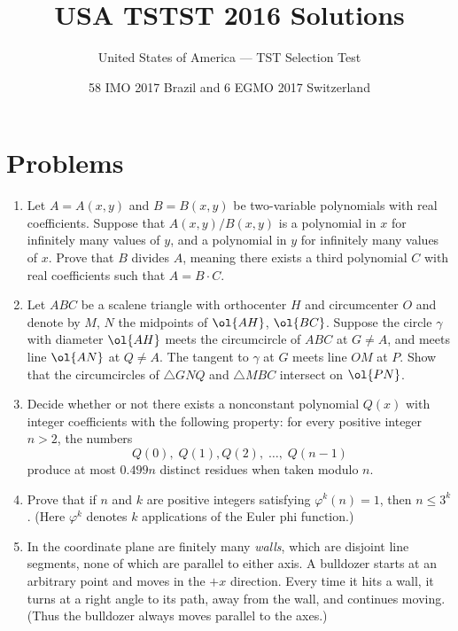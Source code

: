 \documentclass[11pt]{scrartcl}
\begin{document}
\title{USA TSTST 2016 Solutions}
\subtitle{United States of America --- TST Selection Test}
\date{58 IMO 2017 Brazil and 6 EGMO 2017 Switzerland}

\maketitle

\tableofcontents
\newpage

\addtocounter{section}{-1}
\section{Problems}
\begin{enumerate}[\bfseries 1.]
\item %
Let $A = A(x,y)$ and $B = B(x,y)$ be
two-variable polynomials with real coefficients.
Suppose that $A(x,y)/B(x,y)$ is a polynomial in $x$
for infinitely many values of $y$,
and a polynomial in $y$ for infinitely many values of $x$.
Prove that $B$ divides $A$, meaning there exists a third polynomial $C$
with real coefficients such that $A = B \cdot C$.

\item %
Let $ABC$ be a scalene triangle with orthocenter $H$ and circumcenter $O$
and denote by $M$, $N$ the midpoints of $\ol{AH}$, $\ol{BC}$.
Suppose the circle $\gamma$ with diameter $\ol{AH}$ meets
the circumcircle of $ABC$ at $G \neq A$,
and meets line $\ol{AN}$ at $Q \neq A$.
The tangent to $\gamma$ at $G$ meets line $OM$ at $P$.
Show that the circumcircles of $\triangle GNQ$
and $\triangle MBC$ intersect on $\ol{PN}$.

\item %
Decide whether or not there exists a nonconstant polynomial $Q(x)$
with integer coefficients with the following property:
for every positive integer $n > 2$, the numbers
\[ Q(0), \; Q(1), Q(2),  \; \dots, \; Q(n-1) \]
produce at most $0.499n$ distinct residues when taken modulo $n$.

\item %
Prove that if $n$ and $k$ are positive integers
satisfying $\varphi^k(n) = 1$, then $n \le 3^k$.
(Here $\varphi^k$ denotes $k$ applications of the Euler phi function.)

\item %
In the coordinate plane are finitely many \emph{walls},
which are disjoint line segments, none of which are parallel to either axis.
A bulldozer starts at an arbitrary point and moves in the $+x$ direction.
Every time it hits a wall, it turns at a right angle to its path,
away from the wall, and continues moving.
(Thus the bulldozer always moves parallel to the axes.)


\end{enumerate}
\end{document}
